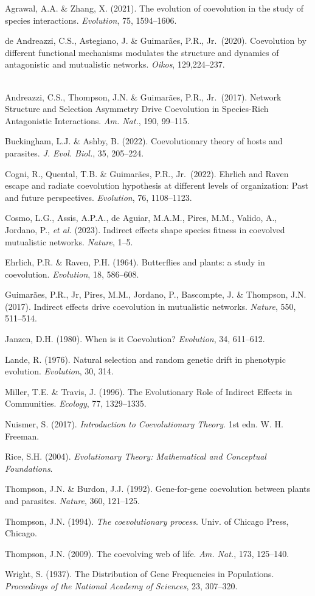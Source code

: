 \documentclass[
]{book}
\begin{document}
Agrawal, A.A. \& Zhang, X. (2021). The evolution of coevolution in the study of species interactions. \emph{Evolution}, 75, 1594--1606.

de Andreazzi, C.S., Astegiano, J. \& Guimarães, P.R., Jr.~(2020). Coevolution by different functional mechanisms modulates the structure and dynamics of antagonistic and mutualistic networks. \emph{Oikos}, 129,224--237.\\
\strut \\
Andreazzi, C.S., Thompson, J.N. \& Guimarães, P.R., Jr.~(2017). Network Structure and Selection Asymmetry Drive Coevolution in Species-Rich Antagonistic Interactions. \emph{Am. Nat.}, 190, 99--115.

Buckingham, L.J. \& Ashby, B. (2022). Coevolutionary theory of hosts and parasites. \emph{J. Evol. Biol.}, 35, 205--224.

Cogni, R., Quental, T.B. \& Guimarães, P.R., Jr.~(2022). Ehrlich and Raven escape and radiate coevolution hypothesis at different levels of organization: Past and future perspectives. \emph{Evolution}, 76, 1108--1123.

Cosmo, L.G., Assis, A.P.A., de Aguiar, M.A.M., Pires, M.M., Valido, A., Jordano, P., \emph{et al.} (2023). Indirect effects shape species fitness in coevolved mutualistic networks. \emph{Nature}, 1--5.

Ehrlich, P.R. \& Raven, P.H. (1964). Butterflies and plants: a study in coevolution. \emph{Evolution}, 18, 586--608.

Guimarães, P.R., Jr, Pires, M.M., Jordano, P., Bascompte, J. \& Thompson, J.N. (2017). Indirect effects drive coevolution in mutualistic networks. \emph{Nature}, 550, 511--514.

Janzen, D.H. (1980). When is it Coevolution? \emph{Evolution}, 34, 611--612.

Lande, R. (1976). Natural selection and random genetic drift in phenotypic evolution. \emph{Evolution}, 30, 314.

Miller, T.E. \& Travis, J. (1996). The Evolutionary Role of Indirect Effects in Communities. \emph{Ecology}, 77, 1329--1335.

Nuismer, S. (2017). \emph{Introduction to Coevolutionary Theory}. 1st edn. W. H. Freeman.

Rice, S.H. (2004). \emph{Evolutionary Theory: Mathematical and Conceptual Foundations}.

Thompson, J.N. \& Burdon, J.J. (1992). Gene-for-gene coevolution between plants and parasites. \emph{Nature}, 360, 121--125.

Thompson, J.N. (1994). \emph{The coevolutionary process}. Univ. of Chicago Press, Chicago.

Thompson, J.N. (2009). The coevolving web of life. \emph{Am. Nat.}, 173, 125--140.

Wright, S. (1937). The Distribution of Gene Frequencies in Populations. \emph{Proceedings of the National Academy of Sciences}, 23, 307--320.

  
\end{document}
